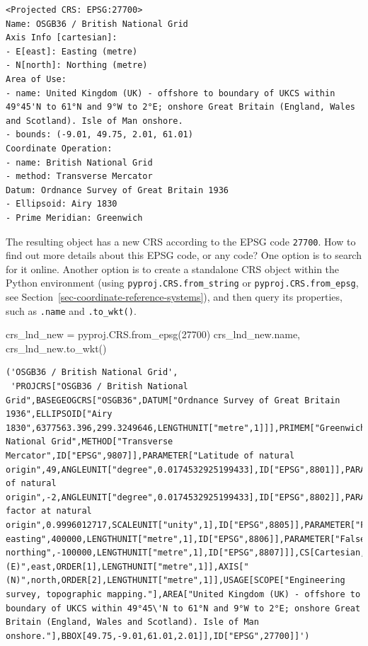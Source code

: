 \documentclass[
  letterpaper,
]{krantz}
\newenvironment{Shaded}{\begin{snugshade}}{\end{snugshade}}
\newcommand{\DecValTok}[1]{\textcolor[rgb]{0.68,0.00,0.00}{#1}}
\newcommand{\NormalTok}[1]{\textcolor[rgb]{0.00,0.23,0.31}{#1}}
\newcommand{\OperatorTok}[1]{\textcolor[rgb]{0.37,0.37,0.37}{#1}}
\begin{document}
\begin{verbatim}
<Projected CRS: EPSG:27700>
Name: OSGB36 / British National Grid
Axis Info [cartesian]:
- E[east]: Easting (metre)
- N[north]: Northing (metre)
Area of Use:
- name: United Kingdom (UK) - offshore to boundary of UKCS within 49°45'N to 61°N and 9°W to 2°E; onshore Great Britain (England, Wales and Scotland). Isle of Man onshore.
- bounds: (-9.01, 49.75, 2.01, 61.01)
Coordinate Operation:
- name: British National Grid
- method: Transverse Mercator
Datum: Ordnance Survey of Great Britain 1936
- Ellipsoid: Airy 1830
- Prime Meridian: Greenwich
\end{verbatim}

The resulting object has a new CRS according to the EPSG code
\texttt{27700}. How to find out more details about this EPSG code, or
any code? One option is to search for it online. Another option is to
create a standalone CRS object within the Python environment (using
\texttt{pyproj.CRS.from\_string} or \texttt{pyproj.CRS.from\_epsg}, see
Section~\ref{sec-coordinate-reference-systems}), and then query its
properties, such as \texttt{.name} and \texttt{.to\_wkt()}.

\begin{Shaded}
\begin{Highlighting}[]
\NormalTok{crs\_lnd\_new }\OperatorTok{=}\NormalTok{ pyproj.CRS.from\_epsg(}\DecValTok{27700}\NormalTok{)}
\NormalTok{crs\_lnd\_new.name, crs\_lnd\_new.to\_wkt()}
\end{Highlighting}
\end{Shaded}

\begin{verbatim}
('OSGB36 / British National Grid',
 'PROJCRS["OSGB36 / British National Grid",BASEGEOGCRS["OSGB36",DATUM["Ordnance Survey of Great Britain 1936",ELLIPSOID["Airy 1830",6377563.396,299.3249646,LENGTHUNIT["metre",1]]],PRIMEM["Greenwich",0,ANGLEUNIT["degree",0.0174532925199433]],ID["EPSG",4277]],CONVERSION["British National Grid",METHOD["Transverse Mercator",ID["EPSG",9807]],PARAMETER["Latitude of natural origin",49,ANGLEUNIT["degree",0.0174532925199433],ID["EPSG",8801]],PARAMETER["Longitude of natural origin",-2,ANGLEUNIT["degree",0.0174532925199433],ID["EPSG",8802]],PARAMETER["Scale factor at natural origin",0.9996012717,SCALEUNIT["unity",1],ID["EPSG",8805]],PARAMETER["False easting",400000,LENGTHUNIT["metre",1],ID["EPSG",8806]],PARAMETER["False northing",-100000,LENGTHUNIT["metre",1],ID["EPSG",8807]]],CS[Cartesian,2],AXIS["(E)",east,ORDER[1],LENGTHUNIT["metre",1]],AXIS["(N)",north,ORDER[2],LENGTHUNIT["metre",1]],USAGE[SCOPE["Engineering survey, topographic mapping."],AREA["United Kingdom (UK) - offshore to boundary of UKCS within 49°45\'N to 61°N and 9°W to 2°E; onshore Great Britain (England, Wales and Scotland). Isle of Man onshore."],BBOX[49.75,-9.01,61.01,2.01]],ID["EPSG",27700]]')
\end{verbatim}
\end{document}
